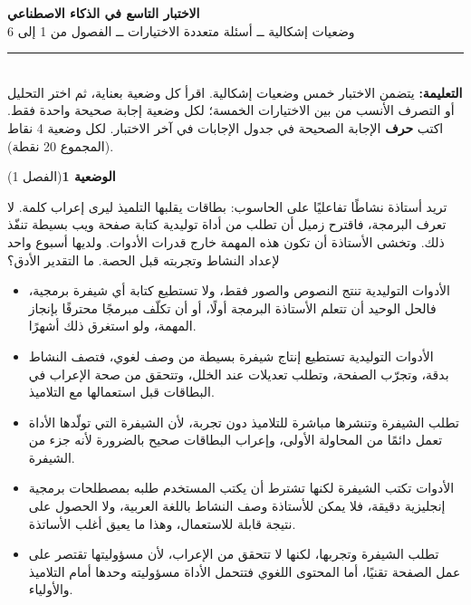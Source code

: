 \documentclass[11pt,a4paper]{article}
\begin{document}
\linespread{1.08}\selectfont
\begin{center}
{\LARGE\khatt\textbf{الاختبار التاسع في الذكاء الاصطناعي}}\\[4pt]
{\normalsize وضعيات إشكالية ــ أسئلة متعددة الاختيارات ــ الفصول من 1 إلى 6}
\end{center}
\vspace{-2pt}\rule{\textwidth}{0.6pt}\\[2pt]
\textbf{التعليمة:} يتضمن الاختبار خمس وضعيات إشكالية. اقرأ كل وضعية بعناية، ثم اختر التحليل أو التصرف الأنسب
من بين الاختيارات الخمسة؛ لكل وضعية إجابة صحيحة واحدة فقط.
اكتب \textbf{حرف} الإجابة الصحيحة في جدول الإجابات في آخر الاختبار.
لكل وضعية 4 نقاط (المجموع 20 نقطة).
\vspace{4pt}

\noindent
{\large\khatt\textbf{الوضعية 1}}\hfill{\small(الفصل 1)}\par\nopagebreak\vspace{3pt}
\setlength{\fboxsep}{7pt}\colorbox{gray!10}{\parbox{\dimexpr\linewidth-14pt}{تريد أستاذة نشاطًا تفاعليًا على الحاسوب: بطاقات يقلبها التلميذ ليرى إعراب كلمة. لا تعرف البرمجة، فاقترح زميل أن تطلب من أداة توليدية كتابة صفحة ويب بسيطة تنفّذ ذلك. وتخشى الأستاذة أن تكون هذه المهمة خارج قدرات الأدوات. ولديها أسبوع واحد لإعداد النشاط وتجربته قبل الحصة. ما التقدير الأدق؟}}\par\nopagebreak
\begin{itemize}[leftmargin=1.0cm, labelsep=6pt, itemsep=3pt, topsep=4pt, parsep=0pt]
  \item[\textbf{أ)}] الأدوات التوليدية تنتج النصوص والصور فقط، ولا تستطيع كتابة أي شيفرة برمجية، فالحل الوحيد أن تتعلم الأستاذة البرمجة أولًا، أو أن تكلّف مبرمجًا محترفًا بإنجاز المهمة، ولو استغرق ذلك أشهرًا.
  \item[\textbf{ب)}] الأدوات التوليدية تستطيع إنتاج شيفرة بسيطة من وصف لغوي، فتصف النشاط بدقة، وتجرّب الصفحة، وتطلب تعديلات عند الخلل، وتتحقق من صحة الإعراب في البطاقات قبل استعمالها مع التلاميذ.
  \item[\textbf{ج)}] تطلب الشيفرة وتنشرها مباشرة للتلاميذ دون تجربة، لأن الشيفرة التي تولّدها الأداة تعمل دائمًا من المحاولة الأولى، وإعراب البطاقات صحيح بالضرورة لأنه جزء من الشيفرة.
  \item[\textbf{د)}] الأدوات تكتب الشيفرة لكنها تشترط أن يكتب المستخدم طلبه بمصطلحات برمجية إنجليزية دقيقة، فلا يمكن للأستاذة وصف النشاط باللغة العربية، ولا الحصول على نتيجة قابلة للاستعمال، وهذا ما يعيق أغلب الأساتذة.
  \item[\textbf{هـ)}] تطلب الشيفرة وتجربها، لكنها لا تتحقق من الإعراب، لأن مسؤوليتها تقتصر على عمل الصفحة تقنيًا، أما المحتوى اللغوي فتتحمل الأداة مسؤوليته وحدها أمام التلاميذ والأولياء.
\end{itemize}
\end{document}

